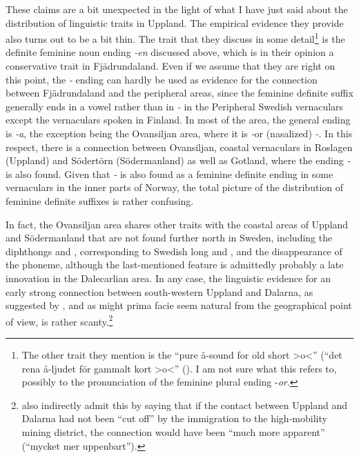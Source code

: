 These claims are a bit unexpected in the light of what I have just said about the distribution of linguistic traits in Uppland. The empirical evidence they provide also turns out to be a bit thin. The trait that they discuss in some detail\footnote{ The other trait they mention is the “pure å-sound for old short {\textgreater}o{\textless}” (“det rena å-ljudet för gammalt kort {\textgreater}o{\textless}” (\citealt[315]{LindströmEtAl2006}). I am not sure what this refers to, possibly to the pronunciation of the feminine plural ending -\textit{o}\textit{r}.} is the definite feminine noun ending \textit{{}-en} discussed above, which is in their opinion a conservative trait in Fjädrundaland. Even if we assume that they are right on this point, the\textit{ {}-} ending can hardly be used as evidence for the connection between Fjädrundaland and the peripheral areas, since the feminine definite suffix generally ends in a vowel rather than in\textit{ {}-} in the Peripheral Swedish vernaculars except the vernaculars spoken in Finland.  In most of the area, the general ending is\textit{ {}-a}, the exception being the Ovansiljan area, where it is\textit{ {}-}or (nasalized)\textit{ {}-}. In this respect, there is a connection between Ovansiljan, coastal vernaculars in Roslagen (Uppland) and Södertörn (Södermanland) as well as Gotland, where the ending\textit{ {}-} is also found. Given that\textit{ {}-} is also found as a feminine definite ending in some vernaculars in the inner parts of Norway, the total picture of the distribution of feminine definite suffixes is rather confusing. 

In fact, the Ovansiljan area shares other traits with the coastal areas of Uppland and Södermanland that are not found further north in Sweden, including the diphthongs  and , corresponding to Swedish long  and , and the disappearance of the  phoneme, although the last-mentioned feature is admittedly probably a late innovation in the Dalecarlian area. In any case, the linguistic evidence for an early strong connection between south-western Uppland and Dalarna, as suggested by \citet[237]{LindströmEtAl2006}, and as might prima facie seem natural from the geographical point of view, is rather scanty.\footnote{\citet[237]{LindströmEtAl2006} also indirectly admit this by saying that if the contact between Uppland and Dalarna had not been “cut off” by the immigration to the high-mobility mining district, the connection would have been “much more apparent” (“mycket mer uppenbart”).}

